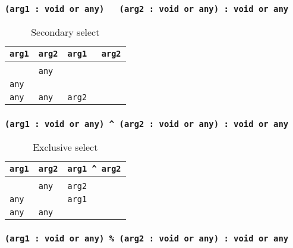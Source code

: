 \subsubsection{\texttt{(arg1 : void or any) ~ (arg2 : void or any) : void or any}}

\begin{table}[H]
	\caption{Secondary select}
	\label{eqhacktable}
	\begin{tabular}{|l|l|l|}
		\hline
		\texttt{arg1} & \texttt{arg2} & \texttt{arg1 ~ arg2} \\ \hline
		\void{}     & \void{}     & \void{}   			\\ \hline
		\void{}     & \texttt{any}  & \void{}   			\\ \hline
		\texttt{any}  & \void{}     & \void{}   			\\ \hline
		\texttt{any}  & \texttt{any}  & \texttt{arg2}   		\\ \hline
	\end{tabular}
\end{table}

\subsubsection{\texttt{(arg1 : void or any) ^ (arg2 : void or any) : void or any}}

\begin{table}[H]
	\caption{Exclusive select}
	\label{xorhacktable}
	\begin{tabular}{|l|l|l|}
		\hline
		\texttt{arg1} & \texttt{arg2} & \texttt{arg1 ^ arg2} \\ \hline
		\void{}     & \void{}     & \void{}   			\\ \hline
		\void{}     & \texttt{any}  & \texttt{arg2}   		\\ \hline
		\texttt{any}  & \void{}     & \texttt{arg1}   		\\ \hline
		\texttt{any}  & \texttt{any}  & \void{}   			\\ \hline
	\end{tabular}
\end{table}

\subsubsection{\texttt{(arg1 : void or any) \% (arg2 : void or any) : void or any}}

